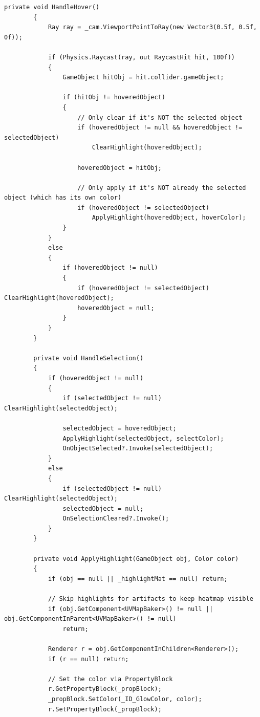 \begin{lstlisting}[language={[Sharp]C}, caption={ObjectPicker.cs: Crosshair-based physical material editor and artifact interaction logic.}, label={lst:objectpicker}]
        private void HandleHover()
        {
            Ray ray = _cam.ViewportPointToRay(new Vector3(0.5f, 0.5f, 0f));

            if (Physics.Raycast(ray, out RaycastHit hit, 100f))
            {
                GameObject hitObj = hit.collider.gameObject;

                if (hitObj != hoveredObject)
                {
                    // Only clear if it's NOT the selected object
                    if (hoveredObject != null && hoveredObject != selectedObject) 
                        ClearHighlight(hoveredObject);

                    hoveredObject = hitObj;

                    // Only apply if it's NOT already the selected object (which has its own color)
                    if (hoveredObject != selectedObject)
                        ApplyHighlight(hoveredObject, hoverColor);
                }
            }
            else
            {
                if (hoveredObject != null)
                {
                    if (hoveredObject != selectedObject) ClearHighlight(hoveredObject);
                    hoveredObject = null;
                }
            }
        }

        private void HandleSelection()
        {
            if (hoveredObject != null)
            {
                if (selectedObject != null) ClearHighlight(selectedObject);
                
                selectedObject = hoveredObject;
                ApplyHighlight(selectedObject, selectColor);
                OnObjectSelected?.Invoke(selectedObject);
            }
            else
            {
                if (selectedObject != null) ClearHighlight(selectedObject);
                selectedObject = null;
                OnSelectionCleared?.Invoke();
            }
        }

        private void ApplyHighlight(GameObject obj, Color color)
        {
            if (obj == null || _highlightMat == null) return;

            // Skip highlights for artifacts to keep heatmap visible
            if (obj.GetComponent<UVMapBaker>() != null || obj.GetComponentInParent<UVMapBaker>() != null)
                return;

            Renderer r = obj.GetComponentInChildren<Renderer>();
            if (r == null) return;

            // Set the color via PropertyBlock
            r.GetPropertyBlock(_propBlock);
            _propBlock.SetColor(_ID_GlowColor, color);
            r.SetPropertyBlock(_propBlock);


\end{lstlisting}
